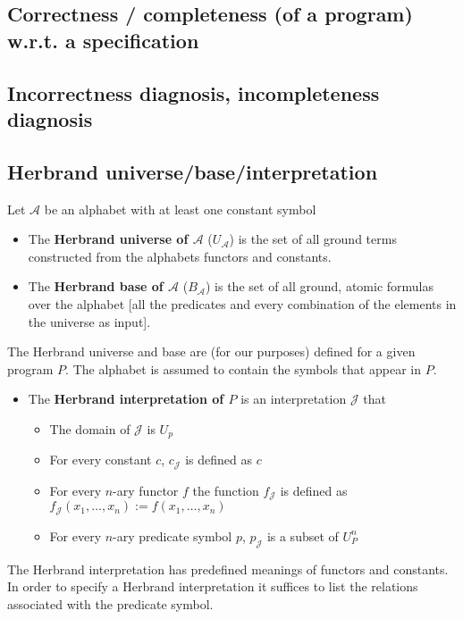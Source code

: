 \documentclass{article}
\begin{document}
\subsection{Correctness / completeness (of a program) w.r.t. a specification}

\subsection{Incorrectness diagnosis, incompleteness diagnosis}

\pagebreak

\subsection{Herbrand universe/base/interpretation}
Let $\mathcal{A}$ be an alphabet with at least one constant symbol
\begin{itemize}
  \item The \textbf{Herbrand universe of $\mathcal{A}$} ($U_\mathcal{A}$) is the set of all ground terms constructed from the alphabets functors and constants.
  \item The \textbf{Herbrand base of $\mathcal{A}$} ($B_\mathcal{A}$) is the set of all ground, atomic formulas over the alphabet [all the predicates and every combination of the elements in the universe as input].
\end{itemize}
The Herbrand universe and base are (for our purposes) defined for a given program $P$. The alphabet is assumed to contain the symbols that appear in $P$.
\begin{itemize}
  \item The \textbf{Herbrand interpretation of $P$} is an interpretation $\mathcal{J}$ that
  \begin{itemize}
    \item The domain of $\mathcal{J}$ is $U_p$
    \item For every constant $c$, $c_\mathcal{J}$ is defined as $c$
    \item For every $n$-ary functor $f$ the function $f_\mathcal{J}$ is defined as \\$f_\mathcal{J}(x_1,\ldots,x_n):=f(x_1,\ldots,x_n)$
    \item For every $n$-ary predicate symbol $p$, $p_\mathcal{J}$ is a subset of $U^n_P$
  \end{itemize}
\end{itemize}
The Herbrand interpretation has predefined meanings of functors and constants. In order to specify a Herbrand interpretation it suffices to list the relations associated with the predicate symbol.
\end{document}
